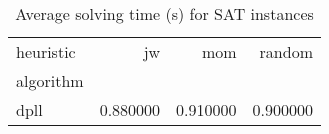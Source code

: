 \begin{table}
\caption{Average solving time (s) for SAT instances}
\label{tab:avg-time-sat}
\begin{tabular}{lrrr}
\toprule
heuristic & jw & mom & random \\
algorithm &  &  &  \\
\midrule
dpll & 0.880000 & 0.910000 & 0.900000 \\
\bottomrule
\end{tabular}
\end{table}
